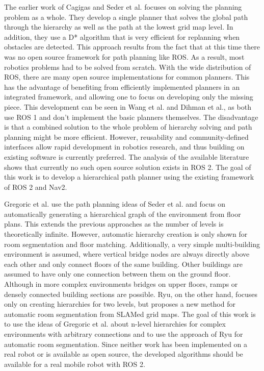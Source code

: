 The earlier work of Cagigas and Seder et al. focuses on solving the planning problem as a whole. They develop a single planner that solves the global path through the hierarchy as well as the path at the lowest grid map level. In addition, they use a D* algorithm that is very efficient for replanning when obstacles are detected. This approach results from the fact that at this time there was no open source framework for path planning like ROS. As a result, most robotics problems had to be solved from scratch. With the wide distribution of ROS, there are many open source implementations for common planners. This has the advantage of benefiting from efficiently implemented planners in an integrated framework, and allowing one to focus on developing only the missing piece. This development can be seen in Wang et al. and Dihman et al., as both use ROS 1 and don't implement the basic planners themselves. The disadvantage is that a combined solution to the whole problem of hierarchy solving and path planning might be more efficient. However, reusability and community-defined interfaces allow rapid development in robotics research, and thus building on existing software is currently preferred. The analysis of the available literature shows that currently no such open source solution exists in ROS 2. The goal of this work is to develop a hierarchical path planner using the existing framework of ROS 2 and Nav2.

Gregoric et al. use the path planning ideas of Seder et al. and focus on automatically generating a hierarchical graph of the environment from floor plans. This extends the previous approaches as the number of levels is theoretically infinite. However, automatic hierarchy creation is only shown for room segmentation and floor matching. Additionally, a very simple multi-building environment is assumed, where vertical bridge nodes are always directly above each other and only connect floors of the same building. Other buildings are assumed to have only one connection between them on the ground floor. Although in more complex environments bridges on upper floors, ramps or densely connected building sections are possible. Ryu, on the other hand, focuses only on creating hierarchies for two levels, but proposes a new method for automatic room segmentation from SLAMed grid maps. The goal of this work is to use the ideas of Gregoric et al. about n-level hierarchies for complex environments with arbitrary connections and to use the approach of Ryu for automatic room segmentation. Since neither work has been implemented on a real robot or is available as open source, the developed algorithms should be available for a real mobile robot with ROS 2.

